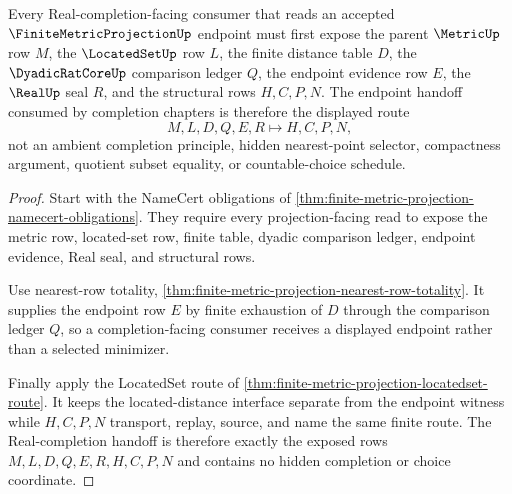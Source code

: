 \begin{theorem}
\label{thm:finite-metric-projection-real-completion-handoff}
Every Real-completion-facing consumer that reads an accepted $\FiniteMetricProjectionUp$ endpoint must first expose the parent $\MetricUp$ row $M$, the $\LocatedSetUp$ row $L$, the finite distance table $D$, the $\DyadicRatCoreUp$ comparison ledger $Q$, the endpoint evidence row $E$, the $\RealUp$ seal $R$, and the structural rows $H,C,P,N$. The endpoint handoff consumed by completion chapters is therefore the displayed route
$$
M,L,D,Q,E,R \longmapsto H,C,P,N,
$$
not an ambient completion principle, hidden nearest-point selector, compactness argument, quotient subset equality, or countable-choice schedule.
\end{theorem}
\begin{proof}
Start with the NameCert obligations of \autoref{thm:finite-metric-projection-namecert-obligations}. They require every projection-facing read to expose the metric row, located-set row, finite table, dyadic comparison ledger, endpoint evidence, Real seal, and structural rows.

Use nearest-row totality, \autoref{thm:finite-metric-projection-nearest-row-totality}. It supplies the endpoint row $E$ by finite exhaustion of $D$ through the comparison ledger $Q$, so a completion-facing consumer receives a displayed endpoint rather than a selected minimizer.

Finally apply the LocatedSet route of \autoref{thm:finite-metric-projection-locatedset-route}. It keeps the located-distance interface separate from the endpoint witness while $H,C,P,N$ transport, replay, source, and name the same finite route. The Real-completion handoff is therefore exactly the exposed rows $M,L,D,Q,E,R,H,C,P,N$ and contains no hidden completion or choice coordinate.
\end{proof}

\begin{closurestatus}{\FiniteMetricProjectionUp}
  \theoryclosure{\seedClosure}
  \formalstatus{\unformalizedV}
\end{closurestatus}
